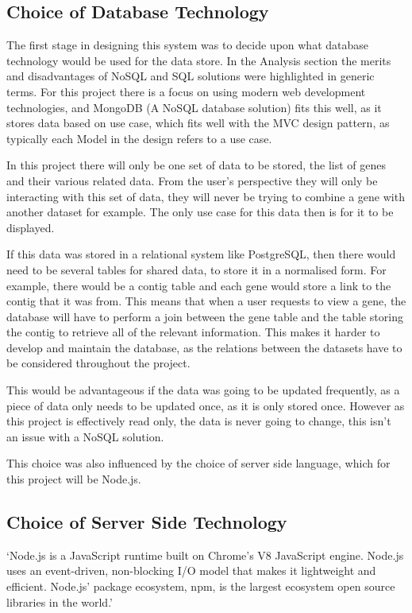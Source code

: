 \subsection{Choice of Database Technology}
The first stage in designing this system was to decide upon what database technology would be used for the data store. In the Analysis section the merits and disadvantages of NoSQL and SQL solutions were highlighted in generic terms. For this project there is a focus on using modern web development technologies, and MongoDB (A NoSQL database solution) fits this well, as it stores data based on use case, which fits well with the MVC design pattern, as typically each Model in the design refers to a use case. 

In this project there will only be one set of data to be stored, the list of genes and their various related data. From the user's perspective they will only be interacting with this set of data, they will never be trying to combine a gene with another dataset for example. The only use case for this data then is for it to be displayed. 

If this data was stored in a relational system like PostgreSQL, then there would need to be several tables for shared data, to store it in a normalised form. For example, there would be a contig table and each gene would store a link to the contig that it was from. This means that when a user requests to view a gene, the database will have to perform a join between the gene table and the table storing the contig to retrieve all of the relevant information. This makes it harder to develop and maintain the database, as the relations between the datasets have to be considered throughout the project. 

This would be advantageous if the data was going to be updated frequently, as a piece of data only needs to be updated once, as it is only stored once. However as this project is effectively read only, the data is never going to change, this isn't an issue with a NoSQL solution.

This choice was also influenced by the choice of server side language, which for this project will be Node.js. 

\subsection{Choice of Server Side Technology}
`Node.js is a JavaScript runtime built on Chrome's V8 JavaScript engine. Node.js uses an event-driven, non-blocking I/O model that makes it lightweight and efficient. Node.js' package ecosystem, npm, is the largest ecosystem open source libraries in the world.'\cite{node-org}

